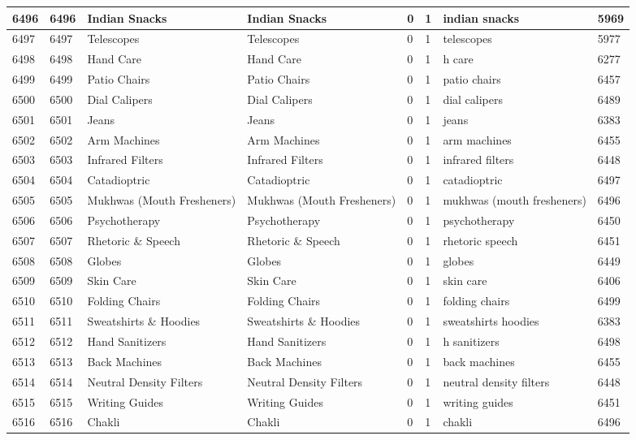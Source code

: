 \begin{longtable}{|l|l|l|l|l|l|l|l|}
6496 & 6496 & Indian Snacks & Indian Snacks & 0 & 1 & indian snacks & 5969 \\ \hline 
6497 & 6497 & Telescopes & Telescopes & 0 & 1 & telescopes & 5977 \\ \hline 
6498 & 6498 & Hand Care & Hand Care & 0 & 1 & h care & 6277 \\ \hline 
6499 & 6499 & Patio Chairs & Patio Chairs & 0 & 1 & patio chairs & 6457 \\ \hline 
6500 & 6500 & Dial Calipers & Dial Calipers & 0 & 1 & dial calipers & 6489 \\ \hline 
6501 & 6501 & Jeans & Jeans & 0 & 1 & jeans & 6383 \\ \hline 
6502 & 6502 & Arm Machines & Arm Machines & 0 & 1 & arm machines & 6455 \\ \hline 
6503 & 6503 & Infrared Filters & Infrared Filters & 0 & 1 & infrared filters & 6448 \\ \hline 
6504 & 6504 & Catadioptric & Catadioptric & 0 & 1 & catadioptric & 6497 \\ \hline 
6505 & 6505 & Mukhwas (Mouth Fresheners) & Mukhwas (Mouth Fresheners) & 0 & 1 & mukhwas (mouth fresheners) & 6496 \\ \hline 
6506 & 6506 & Psychotherapy & Psychotherapy & 0 & 1 & psychotherapy & 6450 \\ \hline 
6507 & 6507 & Rhetoric \& Speech & Rhetoric \& Speech & 0 & 1 & rhetoric speech & 6451 \\ \hline 
6508 & 6508 & Globes & Globes & 0 & 1 & globes & 6449 \\ \hline 
6509 & 6509 & Skin Care & Skin Care & 0 & 1 & skin care & 6406 \\ \hline 
6510 & 6510 & Folding Chairs & Folding Chairs & 0 & 1 & folding chairs & 6499 \\ \hline 
6511 & 6511 & Sweatshirts \& Hoodies & Sweatshirts \& Hoodies & 0 & 1 & sweatshirts hoodies & 6383 \\ \hline 
6512 & 6512 & Hand Sanitizers & Hand Sanitizers & 0 & 1 & h sanitizers & 6498 \\ \hline 
6513 & 6513 & Back Machines & Back Machines & 0 & 1 & back machines & 6455 \\ \hline 
6514 & 6514 & Neutral Density Filters & Neutral Density Filters & 0 & 1 & neutral density filters & 6448 \\ \hline 
6515 & 6515 & Writing Guides & Writing Guides & 0 & 1 & writing guides & 6451 \\ \hline 
6516 & 6516 & Chakli & Chakli & 0 & 1 & chakli & 6496 \\ \hline 

\end{longtable}

